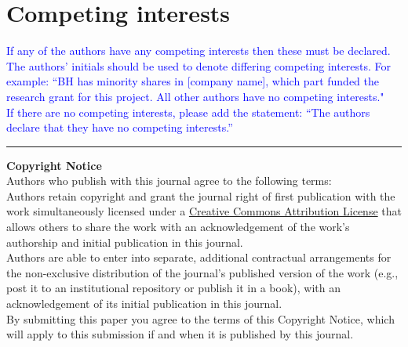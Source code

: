 \documentclass{jors}
\begin{document}
\section*{Competing interests}

\textcolor{blue}{If any of the authors have any competing interests then these must be declared. The authors’ initials should be used to denote differing competing interests. For example: “BH has minority shares in [company name], which part funded the research grant for this project. All other authors have no competing interests." \\
If there are no competing interests, please add the statement:
“The authors declare that they have no competing interests.” }


\printbibliography



\vspace{2cm}

\rule{\textwidth}{1pt}

{ \bf Copyright Notice} \\
Authors who publish with this journal agree to the following terms: \\

Authors retain copyright and grant the journal right of first publication with the work simultaneously licensed under a  \href{http://creativecommons.org/licenses/by/3.0/}{Creative Commons Attribution License} that allows others to share the work with an acknowledgement of the work's authorship and initial publication in this journal. \\

Authors are able to enter into separate, additional contractual arrangements for the non-exclusive distribution of the journal's published version of the work (e.g., post it to an institutional repository or publish it in a book), with an acknowledgement of its initial publication in this journal. \\

By submitting this paper you agree to the terms of this Copyright Notice, which will apply to this submission if and when it is published by this journal.
\end{document}
